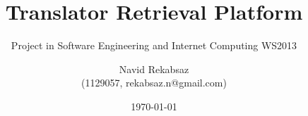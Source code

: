 \title{Translator Retrieval Platform}
\subtitle{Project in Software Engineering and Internet Computing WS2013 \\[0.8cm] {\rmfamily\normalfont\Large}}

\author{
    Navid Rekabsaz \\ {\small (1129057, rekabsaz.n@gmail.com)}
}

\date{\today}
